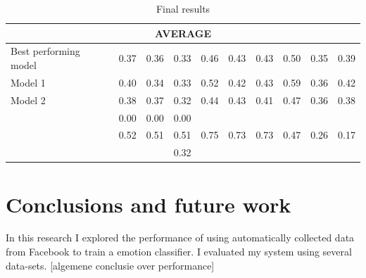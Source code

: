 \documentclass[11pt]{article}
\begin{document}
\begin{table}[!htbp]
\begin{tabular}{|l|l|l|l|l|l|l|l|l|l|}
\hline
    \multicolumn{10}{|c|}{{AVERAGE}} \\                               
    
\hline
  \tiny{Best performing model} & 
  \footnotesize{0.37} & 
  \footnotesize{0.36} & 
  \footnotesize{0.33} & 
  \footnotesize{0.46} & 
  \footnotesize{0.43} & 
  \footnotesize{0.43} & 
  \footnotesize{0.50} & 
  \footnotesize{0.35} & 
  \footnotesize{0.39} \\ 

\hline
    \tiny{Model 1} & 
    \footnotesize{0.40} & 
    \footnotesize{0.34} & 
    \footnotesize{0.33} & 
    \footnotesize{0.52} & 
    \footnotesize{0.42} & 
    \footnotesize{0.43} & 
    \footnotesize{0.59} & 
    \footnotesize{0.36} & 
    \footnotesize{0.42} \\ 

\hline
    \tiny{Model 2} & 
    \footnotesize{0.38} & 
    \footnotesize{0.37} & 
    \footnotesize{0.32} & 
    \footnotesize{0.44} & 
    \footnotesize{0.43} & 
    \footnotesize{0.41} & 
    \footnotesize{0.47} & 
    \footnotesize{0.36} & 
    \footnotesize{0.38} \\ 

\hline
    \tiny{\cite{strapparava2008learning} } &
    \footnotesize{0.00} & 
    \footnotesize{0.00} & 
    \footnotesize{0.00} &
    &
    &
    &
    &
    &
    \\

\hline
    \tiny{\cite{kim2010evaluation} } &
    \footnotesize{0.52} & 
    \footnotesize{0.51} & 
    \footnotesize{0.51} &
    \footnotesize{0.75} & 
    \footnotesize{0.73} & 
    \footnotesize{0.73} &
    \footnotesize{0.47} & 
    \footnotesize{0.26} & 
    \footnotesize{0.17} \\
    
\hline
    \tiny{\cite{danisman2008feeler} } &
    \footnotesize{} & 
    \footnotesize{} & 
    \footnotesize{0.32} &
    \footnotesize{} & 
    \footnotesize{} & 
    \footnotesize{} &
    \footnotesize{} & 
    \footnotesize{} & 
    \footnotesize{} \\
\hline

\end{tabular}
\caption{Final results}
\label{final_results}
\end{table}


\newpage
\section{Conclusions and future work}
In this research I explored the performance of using automatically collected data from Facebook to train a emotion classifier. I evaluated my system using several data-sets. [algemene conclusie over performance]
\end{document}
